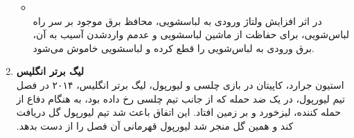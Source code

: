 \begin{qsolve}[]
\begin{enumerate}
\begin{itemize}
			\item {}\\
			در اثر افزایش ولتاژ ورودی به لباسشویی، محافظ برق موجود بر سر راه لباس‌شویی، برای حفاظت از ماشین لباسشویی و عدمم واردشدن آسیب به آن، برق ورودی به لباس‌شویی را قطع کرده و لباسشویی خاموش می‌شود.
		\end{itemize}
		
		
		\item 
		\textbf{لیگ برتر انگلیس}\\
		‫در‬ ‫فصل‬ ‫‪۲۰۱۴‬‬ ‫لیگ‬ ‫برتر‬ ‫انگلیس‪،‬‬ ‫در‬ ‫بازی‬ ‫چلسی‬ ‫و‬ ‫لیورپول‪،‬‬ ‫استیون‬ ‫جرارد‬، کاپیتان تیم لیورپول، در یک ضد حمله که از جانب تیم چلسی رخ داده بود، ‫به هنگام دفاع از حمله کننده، لیز‬‫خورد‬ و بر زمین افتاد. این اتفاق‬ ‫باعث‬ ‫شد‬ ‫تیم‬ ‫لیورپول‬ ‫گل‬ ‫دریافت‬ ‫کند‬ ‫و‬ ‫همین‬ ‫گل‬ ‫منجر‬ ‫شد‬ ‫لیورپول‬ ‫قهرمانی‬ ‫آن‬ ‫فصل‬ ‫را‬ ‫از‬ ‫دست‬ ‫بدهد‪.‬‬	
	\end{enumerate}
\end{qsolve}





